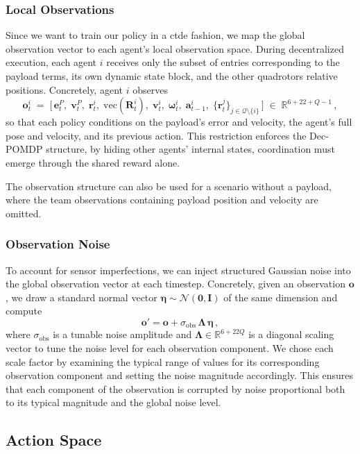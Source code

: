 \subsubsection{Local Observations}
Since we want to train our policy in a \gls{ctde} fashion, we map the global observation vector to each agent's local observation space. During decentralized execution, each agent \(i\) receives only the subset of entries corresponding to the payload terms, its own dynamic state block, and the other quadrotors relative positions.  Concretely, agent \(i\) observes
\begin{equation}
\mathbf{o}^i_t 
\;=\;
\bigl[\,
\mathbf{e}^P_t,\;\mathbf{v}^P_t,\;\mathbf{r}^i_t,\;\mathrm{vec}(\mathbf{R}^i_t),\;\mathbf{v}^i_t,\;\boldsymbol{\omega}^i_t,\;\mathbf{a}^i_{t-1},\;
\{\mathbf{r}^j_t\}_{j \in \mathcal{Q}\setminus\{i\}}
\,\bigr]\;\in\;\mathbb{R}^{6 + 22 + Q - 1}\,,
\end{equation}
so that each policy conditions on the payload's error and velocity, the agent's full pose and velocity, and its previous action. This restriction enforces the Dec-POMDP structure, by hiding other agents' internal states, coordination must emerge through the shared reward alone.

The observation structure can also be used for a scenario without a payload, where the team observations containing payload position and velocity are omitted.
\subsubsection{Observation Noise}
To account for sensor imperfections, we can inject structured Gaussian noise into the global observation vector at each timestep. Concretely, given an observation $\mathbf{o}$, we draw a standard normal vector $\bm{\eta}\sim\mathcal{N}(\mathbf{0},\mathbf{I})$ of the same dimension and compute
\begin{equation}
    \mathbf{o}' = \mathbf{o} + \sigma_{\mathrm{obs}}\,\bm{\Lambda}\,\bm{\eta}\,,
\end{equation}
where $\sigma_{\mathrm{obs}}$ is a tunable noise amplitude and $\bm{\Lambda}\in\mathbb{R}^{6+22Q}$ is a diagonal scaling vector to tune the noise level for each observation component. We chose each scale factor by examining the typical range of values for its corresponding observation component and setting the noise magnitude accordingly. This ensures that each component of the observation is corrupted by noise proportional both to its typical magnitude and the global noise level.
\subsection{Action Space}

